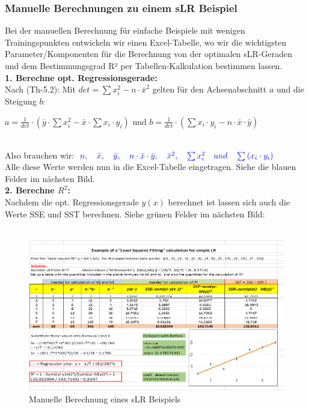 \documentclass[12pt]{article}
\begin{document}
\subsubsection{Manuelle Berechnungen zu einem sLR Beispiel}
%
Bei der manuellen Berechnung für einfache Beispiele mit wenigen  Trainingspunkten entwickeln wir einen Excel-Tabelle, wo wir die wichtigsten Parameter/Komponenten für die Berechnung von der optimalen sLR-Geraden und dem Bestimmungsgrad R² per Tabellen-Kalkulation bestimmen lassen.\\

\textbf{1. Berechne opt. Regressionsgerade:}\\[0.2cm]   
Nach (Th-5.2): Mit $ det = \sum{x_i^2} - n \cdot \bar{x}^2 $ gelten für den Achsenabschnitt $a$ und die Steigung $b$:\\[0.2cm]
\begin{large}
$ a = \frac{1}{det} \cdot (\bar{y} \cdot \sum{x_i^2} - \bar{x} \cdot \sum{x_i \cdot y_i}) $ und $ b = \frac{1}{det} \cdot (\sum {x_i \cdot y_i} - n \cdot \bar{x} \cdot \bar{y})$   \\[0.2cm]
\end{large} \\[0.2cm]
Also brauchen wir: ${\color{blue}{ n, \quad \bar{x}, \quad \bar{y}, \quad n \cdot \bar{x} \cdot \bar{y}, \quad \bar{x}^2, \quad \sum{x_i^2} \quad und \quad \sum{(x_i \cdot y_i)}}}$
\\[0.2cm]
Alle diese Werte werden nun in die Excel-Tabelle eingetragen. Siehe die blauen Felder im nächsten Bild.\\[0.1cm]

\textbf{2. Berechne $R^2$:}\\[0.2cm]
Nachdem die opt. Regressionsgerade $y(x)$ berechnet ist lassen sich auch die  Werte SSE und SST berechnen. Siehe grünen Felder im nächsten Bild:\\
\\[1.5cm]

\begin{figure}[htp]
  \centering
  \hspace*{-0.9cm} 
  \includegraphics[width=1.25 \textwidth]{Einfaches-sLR_Beispiel}
  \caption{Manuelle Berechnung eines sLR Beispiels}
  \label{fig:einfaches-sLR-Bsp}
\end{figure}
%
\newpage
\end{document}
